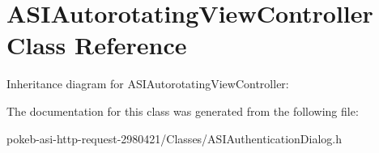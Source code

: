 \hypertarget{interface_a_s_i_autorotating_view_controller}{
\section{\-A\-S\-I\-Autorotating\-View\-Controller \-Class \-Reference}
\label{interface_a_s_i_autorotating_view_controller}
}


\-Inheritance diagram for \-A\-S\-I\-Autorotating\-View\-Controller\-:


\-The documentation for this class was generated from the following file\-:\begin{DoxyCompactItemize}
\item 
pokeb-\/asi-\/http-\/request-\/2980421/\-Classes/\-A\-S\-I\-Authentication\-Dialog.\-h\end{DoxyCompactItemize}
